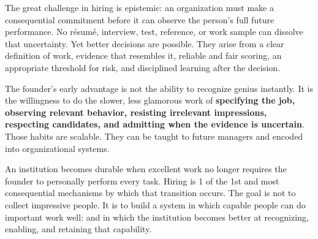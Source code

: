 The great challenge in hiring is epistemic: an organization must make a consequential commitment before it can observe the person's full future performance. No résumé, interview, test, reference, or work sample can dissolve that uncertainty. Yet better decisions are possible. They arise from a clear definition of work, evidence that resembles it, reliable and fair scoring, an appropriate threshold for risk, and disciplined learning after the decision.

The founder's early advantage is not the ability to recognize genius instantly. It is the willingness to do the slower, less glamorous work of \textbf{specifying the job, observing relevant behavior, resisting irrelevant impressions, respecting candidates, and admitting when the evidence is uncertain}. Those habits are scalable. They can be taught to future managers and encoded into organizational systems.

An institution becomes durable when excellent work no longer requires the founder to personally perform every task. Hiring is 1 of the 1st and most consequential mechanisms by which that transition occurs. The goal is not to collect impressive people. It is to build a system in which capable people can do important work well: and in which the institution becomes better at recognizing, enabling, and retaining that capability.
